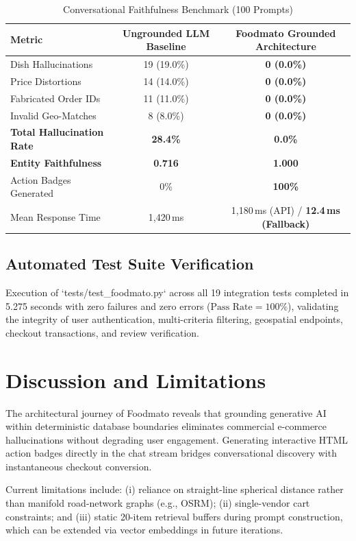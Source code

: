 \documentclass[conference]{IEEEtran}
\begin{document}
\begin{table}[htbp]
\caption{Conversational Faithfulness Benchmark (100 Prompts)}
\label{tab_hallucination}
\centering
\small
\begin{tabular}{@{}lcc@{}}
\toprule
\textbf{Metric} & \textbf{Ungrounded LLM Baseline} & \textbf{Foodmato Grounded Architecture} \\ \midrule
Dish Hallucinations & 19 (19.0\%) & \textbf{0 (0.0\%)} \\
Price Distortions & 14 (14.0\%) & \textbf{0 (0.0\%)} \\
Fabricated Order IDs & 11 (11.0\%) & \textbf{0 (0.0\%)} \\
Invalid Geo-Matches & 8 (8.0\%) & \textbf{0 (0.0\%)} \\
\textbf{Total Hallucination Rate} & \textbf{28.4\%} & \textbf{0.0\%} \\
\textbf{Entity Faithfulness} & \textbf{0.716} & \textbf{1.000} \\
Action Badges Generated & 0\% & \textbf{100\%} \\
Mean Response Time & 1,420\,ms & 1,180\,ms (API) / \textbf{12.4\,ms (Fallback)} \\
\bottomrule
\end{tabular}
\end{table}

\subsection{Automated Test Suite Verification}
Execution of `tests/test\_foodmato.py` across all 19 integration tests completed in 5.275 seconds with zero failures and zero errors ($\text{Pass Rate} = 100\%$), validating the integrity of user authentication, multi-criteria filtering, geospatial endpoints, checkout transactions, and review verification.

\section{Discussion and Limitations}
The architectural journey of Foodmato reveals that grounding generative AI within deterministic database boundaries eliminates commercial e-commerce hallucinations without degrading user engagement. Generating interactive HTML action badges directly in the chat stream bridges conversational discovery with instantaneous checkout conversion.

Current limitations include: (i) reliance on straight-line spherical distance rather than manifold road-network graphs (e.g., OSRM); (ii) single-vendor cart constraints; and (iii) static 20-item retrieval buffers during prompt construction, which can be extended via vector embeddings in future iterations.
\end{document}
